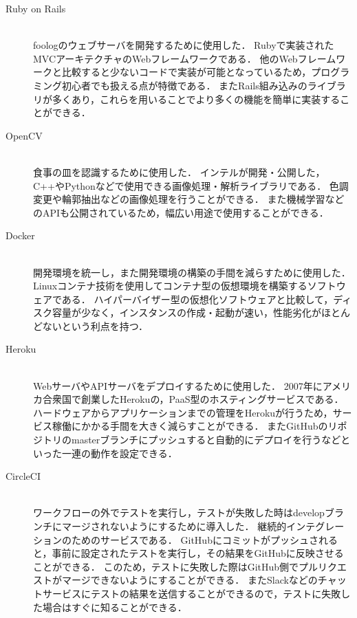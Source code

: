 \documentclass[../report]{subfiles}
\begin{document}
\begin{description}
    \item[Ruby on Rails] \mbox{} \\
        foologのウェブサーバを開発するために使用した．
        Rubyで実装されたMVCアーキテクチャのWebフレームワークである．
        他のWebフレームワークと比較すると少ないコードで実装が可能となっているため，プログラミング初心者でも扱える点が特徴である．
        またRails組み込みのライブラリが多くあり，これらを用いることでより多くの機能を簡単に実装することができる．

    \item[OpenCV] \mbox{} \\
        食事の皿を認識するために使用した．
        インテルが開発・公開した，C++やPythonなどで使用できる画像処理・解析ライブラリである．
        色調変更や輪郭抽出などの画像処理を行うことができる．
        また機械学習などのAPIも公開されているため，幅広い用途で使用することができる．

    \item[Docker] \mbox{} \\
        開発環境を統一し，また開発環境の構築の手間を減らすために使用した．
        Linuxコンテナ技術を使用してコンテナ型の仮想環境を構築するソフトウェアである．
        ハイパーバイザー型の仮想化ソフトウェアと比較して，ディスク容量が少なく，インスタンスの作成・起動が速い，性能劣化がほとんどないという利点を持つ．

  \item[Heroku] \mbox{} \\
    WebサーバやAPIサーバをデプロイするために使用した．
    2007年にアメリカ合衆国で創業したHerokuの，PaaS型のホスティングサービスである．
    ハードウェアからアプリケーションまでの管理をHerokuが行うため，サービス稼働にかかる手間を大きく減らすことができる．
    またGitHubのリポジトリのmasterブランチにプッシュすると自動的にデプロイを行うなどといった一連の動作を設定できる．

  \item[CircleCI] \mbox{} \\
    ワークフローの外でテストを実行し，テストが失敗した時はdevelopブランチにマージされないようにするために導入した．
    継続的インテグレーションのためのサービスである．
    GitHubにコミットがプッシュされると，事前に設定されたテストを実行し，その結果をGitHubに反映させることができる．
    このため，テストに失敗した際はGitHub側でプルリクエストがマージできないようにすることができる．
    またSlackなどのチャットサービスにテストの結果を送信することができるので，テストに失敗した場合はすぐに知ることができる．
\end{description}
\end{document}
